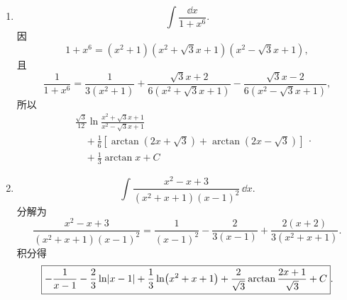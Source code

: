 \begin{xsolution}
\begin{enumerate}[label=(\arabic*)]
    \item
    \[
      \int\frac{\dd x}{1+x^6}.
    \]
    因
    \[
      1+x^6=(x^2+1)(x^2+\sqrt3x+1)(x^2-\sqrt3x+1),
    \]
    且
    \[
      \frac1{1+x^6}
      =\frac1{3(x^2+1)}
       +\frac{\sqrt3x+2}{6(x^2+\sqrt3x+1)}
       -\frac{\sqrt3x-2}{6(x^2-\sqrt3x+1)},
    \]
    所以
    \[
      \boxed{\begin{aligned}
      &\frac{\sqrt3}{12}\ln\frac{x^2+\sqrt3x+1}{x^2-\sqrt3x+1}\\
      &\quad+\frac16\left[
        \arctan(2x+\sqrt3)+\arctan(2x-\sqrt3)
      \right]\\
      &\quad+\frac13\arctan x+C
      \end{aligned}}.
    \]

    \item
    \[
      \int\frac{x^2-x+3}{(x^2+x+1)(x-1)^2}\,\dd x.
    \]
    分解为
    \[
      \frac{x^2-x+3}{(x^2+x+1)(x-1)^2}
      =\frac1{(x-1)^2}-\frac2{3(x-1)}
       +\frac{2(x+2)}{3(x^2+x+1)}.
    \]
    积分得
    \[
      \boxed{-\frac1{x-1}-\frac23\ln\lvert x-1\rvert
      +\frac13\ln(x^2+x+1)
      +\frac2{\sqrt3}\arctan\frac{2x+1}{\sqrt3}+C}.
    \]
  \end{enumerate}
\end{xsolution}


